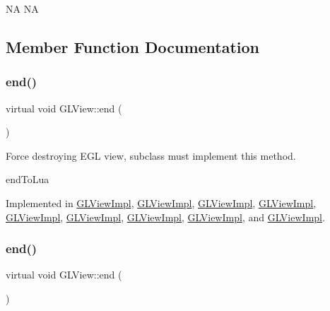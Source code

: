NA  NA 

\subsection{Member Function Documentation}
\mbox{\label{classGLView_aaa284e08de7b4e530a2b15b1d27dced0}} 
\subsubsection{\texorpdfstring{end()}{end()}\hspace{0.1cm}{\footnotesize\ttfamily [1/2]}}
{\footnotesize\ttfamily virtual void G\+L\+View\+::end (\begin{DoxyParamCaption}{ }\end{DoxyParamCaption})\hspace{0.3cm}{\ttfamily [pure virtual]}}

Force destroying E\+GL view, subclass must implement this method.

end\+To\+Lua 

Implemented in \hyperlink{classGLViewImpl_a045b39ae9907d0c2d25d49a70e5ce9e4}{G\+L\+View\+Impl}, \hyperlink{classGLViewImpl_ab5a08a3ea92598cdabbed94686eed58a}{G\+L\+View\+Impl}, \hyperlink{classGLViewImpl_ab5a08a3ea92598cdabbed94686eed58a}{G\+L\+View\+Impl}, \hyperlink{classGLViewImpl_ab5a08a3ea92598cdabbed94686eed58a}{G\+L\+View\+Impl}, \hyperlink{classGLViewImpl_ab5a08a3ea92598cdabbed94686eed58a}{G\+L\+View\+Impl}, \hyperlink{classGLViewImpl_a045b39ae9907d0c2d25d49a70e5ce9e4}{G\+L\+View\+Impl}, \hyperlink{classGLViewImpl_ab2d87c9a94b84691ed9ae4ca378745a8}{G\+L\+View\+Impl}, \hyperlink{classGLViewImpl_ab2d87c9a94b84691ed9ae4ca378745a8}{G\+L\+View\+Impl}, and \hyperlink{classGLViewImpl_ab2d87c9a94b84691ed9ae4ca378745a8}{G\+L\+View\+Impl}.

\mbox{\label{classGLView_aaa284e08de7b4e530a2b15b1d27dced0}} 
\subsubsection{\texorpdfstring{end()}{end()}\hspace{0.1cm}{\footnotesize\ttfamily [2/2]}}
{\footnotesize\ttfamily virtual void G\+L\+View\+::end (\begin{DoxyParamCaption}{ }\end{DoxyParamCaption})\hspace{0.3cm}{\ttfamily [pure virtual]}}

